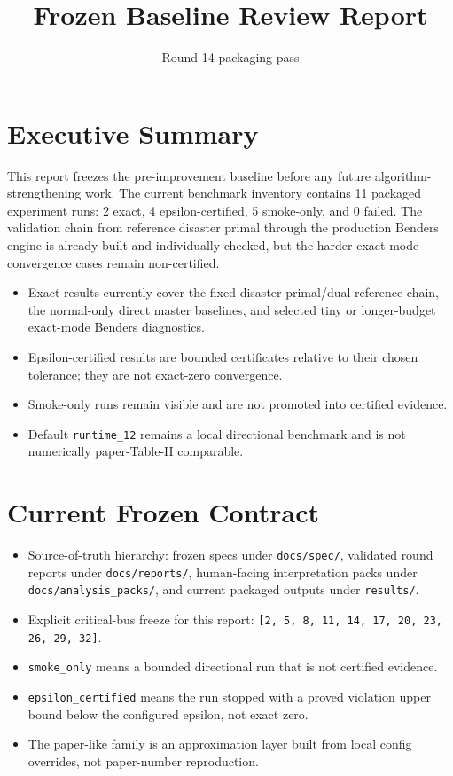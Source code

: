 \documentclass[11pt]{article}
\title{Frozen Baseline Review Report}
\author{Round 14 packaging pass}
\date{}
\begin{document}
\maketitle

\section{Executive Summary}
This report freezes the pre-improvement baseline before any future algorithm-strengthening work. The current benchmark inventory contains 11 packaged experiment runs: 2 exact, 4 epsilon-certified, 5 smoke-only, and 0 failed. The validation chain from reference disaster primal through the production Benders engine is already built and individually checked, but the harder exact-mode convergence cases remain non-certified.

\begin{itemize}
\item Exact results currently cover the fixed disaster primal/dual reference chain, the normal-only direct master baselines, and selected tiny or longer-budget exact-mode Benders diagnostics.
\item Epsilon-certified results are bounded certificates relative to their chosen tolerance; they are not exact-zero convergence.
\item Smoke-only runs remain visible and are not promoted into certified evidence.
\item Default \texttt{runtime\_12} remains a local directional benchmark and is not numerically paper-Table-II comparable.
\end{itemize}

\section{Current Frozen Contract}
\begin{itemize}
\item Source-of-truth hierarchy: frozen specs under \texttt{docs/spec/}, validated round reports under \texttt{docs/reports/}, human-facing interpretation packs under \texttt{docs/analysis\_packs/}, and current packaged outputs under \texttt{results/}.
\item Explicit critical-bus freeze for this report: \texttt{[2, 5, 8, 11, 14, 17, 20, 23, 26, 29, 32]}.
\item \texttt{smoke\_only} means a bounded directional run that is not certified evidence.
\item \texttt{epsilon\_certified} means the run stopped with a proved violation upper bound below the configured epsilon, not exact zero.
\item The paper-like family is an approximation layer built from local config overrides, not paper-number reproduction.
\end{itemize}
\end{document}
